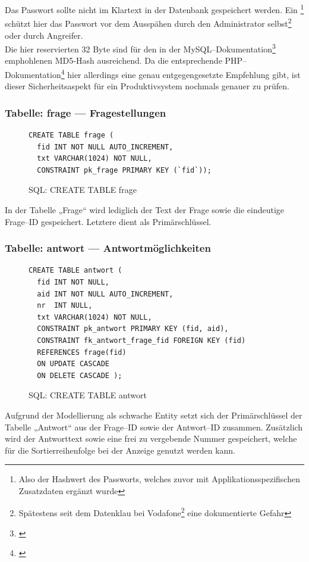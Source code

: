 Das Passwort sollte nicht im Klartext in der Datenbank gespeichert werden. Ein \footnote{Also der Hashwert des Passworts, welches zuvor mit Applikationsspezifischen Zusatzdaten ergänzt wurde} schützt hier das Passwort vor dem Ausspähen durch den Administrator selbst\footnote{Spätestens seit dem Datenklau bei Vodafone\footnote{\cite{vodafone}} eine dokumentierte Gefahr} oder durch Angreifer.\\
Die hier reservierten 32 Byte sind für den in der MySQL--Dokumentation\footnote{\cite{mysql-pcrypt}} emphohlenen MD5-Hash ausreichend. Da die entsprechende PHP--Dokumentation\footnote{\cite{php-pcrypt}} hier allerdings eine genau entgegengesetzte Empfehlung gibt, ist dieser Sicherheitsaspekt für ein Produktivsystem nochmals genauer zu prüfen.

\subsubsection{Tabelle: frage --- Fragestellungen}
\begin{figure}[H]
\begin{verbatim}
CREATE TABLE frage (
  fid INT NOT NULL AUTO_INCREMENT,
  txt VARCHAR(1024) NOT NULL,
  CONSTRAINT pk_frage PRIMARY KEY (`fid`));
\end{verbatim}
\caption{SQL: CREATE TABLE frage}
\label{sql:tblfrage}
\end{figure}

In der Tabelle „Frage“ wird lediglich der Text der Frage sowie die eindeutige Frage--ID gespeichert. Letztere dient als Primärschlüssel.

\subsubsection{Tabelle: antwort --- Antwortmöglichkeiten}
\begin{figure}[H]
\begin{verbatim}
CREATE TABLE antwort (
  fid INT NOT NULL, 
  aid INT NOT NULL AUTO_INCREMENT,
  nr  INT NULL,
  txt VARCHAR(1024) NOT NULL,
  CONSTRAINT pk_antwort PRIMARY KEY (fid, aid),
  CONSTRAINT fk_antwort_frage_fid FOREIGN KEY (fid) 
  REFERENCES frage(fid) 
  ON UPDATE CASCADE 
  ON DELETE CASCADE );
\end{verbatim}
\caption{SQL: CREATE TABLE antwort}
\label{sql:tblantwort}
\end{figure}

Aufgrund der Modellierung als schwache Entity setzt sich der Primärschlüssel der Tabelle „Antwort“ aus der Frage--ID sowie der Antwort--ID zusammen. Zusätzlich wird der Antworttext sowie eine frei zu vergebende Nummer gespeichert, welche für die Sortierreihenfolge bei der Anzeige genutzt werden kann.

